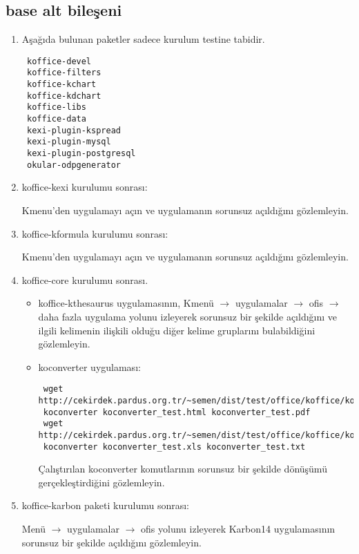 \documentclass[a4paper,10pt]{article}
\begin{document}
\subsection*{base alt bileşeni}
\begin{enumerate}
\item Aşağıda bulunan paketler sadece kurulum testine tabidir.

\begin{verbatim}
 koffice-devel 
 koffice-filters
 koffice-kchart
 koffice-kdchart
 koffice-libs
 koffice-data
 kexi-plugin-kspread
 kexi-plugin-mysql
 kexi-plugin-postgresql
 okular-odpgenerator
\end{verbatim}
\item koffice-kexi kurulumu sonrası:

Kmenu'den uygulamayı açın ve uygulamanın sorunsuz açıldığını gözlemleyin.
\item koffice-kformula kurulumu sonrası:

Kmenu'den uygulamayı açın ve uygulamanın sorunsuz açıldığını gözlemleyin.


\item koffice-core kurulumu sonrası.

\begin{itemize}
\item koffice-kthesaurus uygulamasının, Kmenü $\rightarrow$ uygulamalar $\rightarrow$ ofis $\rightarrow$ daha fazla uygulama yolunu izleyerek sorunsuz bir şekilde açıldığını ve ilgili kelimenin ilişkili olduğu diğer kelime gruplarını bulabildiğini gözlemleyin.

\item koconverter uygulaması:
\begin{verbatim}
 wget http://cekirdek.pardus.org.tr/~semen/dist/test/office/koffice/koconverter_test.html
 koconverter koconverter_test.html koconverter_test.pdf
 wget http://cekirdek.pardus.org.tr/~semen/dist/test/office/koffice/koconverter_test.xls
 koconverter koconverter_test.xls koconverter_test.txt
\end{verbatim}

Çalıştırılan koconverter komutlarının sorunsuz bir şekilde dönüşümü gerçekleştirdiğini gözlemleyin.
\end{itemize}
\item koffice-karbon paketi kurulumu sonrası:

Menü $\rightarrow$ uygulamalar $\rightarrow$ ofis yolunu izleyerek Karbon14 uygulamasının sorunsuz bir şekilde açıldığını gözlemleyin.


\end{enumerate}
\end{document}
